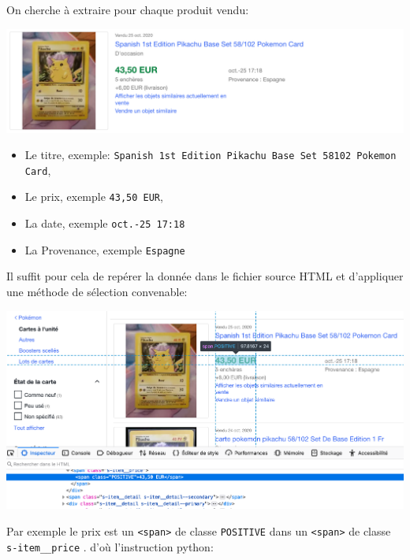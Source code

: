 \documentclass[a4paper]{article}
\begin{document}
On cherche à extraire pour chaque produit vendu: 
\begin{center}
\includegraphics[scale=0.5]{ebay4.png} 
\end{center}

\begin{itemize}
\item Le titre, exemple: {\tt Spanish 1st Edition Pikachu Base Set 58\/102 Pokemon Card},
\item Le prix, exemple {\tt 43,50 EUR},
\item La date, exemple {\tt oct.-25 17:18}
\item La Provenance, exemple {\tt  Espagne}
\end{itemize}

Il suffit pour cela de repérer la donnée dans le fichier source HTML et d'appliquer une méthode de sélection convenable:
\begin{center}
\includegraphics[scale=0.5]{ebay5.png} 
\end{center}
Par exemple le prix est un {\tt <span>} de classe {\tt POSITIVE} dans un {\tt <span>} de classe {\tt s-item\_\_price} . d'où l'instruction python:
\end{document}
